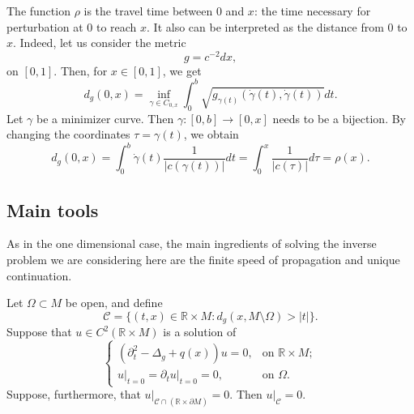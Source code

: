 \documentclass[12pt,oneside,final]{amsart}
\def\R{\mathbb R}
\begin{document}
The function $\rho$ is the travel time between $0$ and $x$: the time necessary for perturbation at $0$ to reach $x$. It also can be interpreted as the distance from $0$ to $x$.
Indeed, let us consider the metric
\begin{equation*}
	g = c^{-2} dx,
\end{equation*}
on $[0,1]$. Then, for $x\in [0,1]$, we get
\begin{equation*}
	d_g(0,x) = \inf_{\gamma\in C_{0,x}} \int_{0}^{b}  \sqrt{g_{\gamma(t)}(\dot{\gamma}(t), \dot{\gamma}(t))} dt.
\end{equation*}
Let $\gamma$ be a minimizer curve. Then $\gamma :[0,b] \rightarrow [0,x]$ needs to be a bijection. By changing the coordinates $\tau = \gamma(t)$, we obtain
\begin{equation*}
	d_g(0,x) = \int_{0}^{b} \dot{\gamma}(t) \frac{1}{|c(\gamma(t))|}dt = \int_{0}^{x} \frac{1}{|c(\tau)|} d\tau = \rho(x).
\end{equation*}





\subsection{Main tools}

As in the one dimensional case, the main ingredients of solving the inverse problem we are considering here are the finite speed of propagation and unique continuation. 

\begin{theorem}
	Let $\Omega\subset M$ be open, and define 
	\begin{equation*}
		\mathcal{C}= \{(t,x)\in \mathbb{R}\times M: d_g(x, M\setminus\Omega)>|t|\}.
	\end{equation*}
Suppose that $u \in C^2(\R \times M)$ is a solution of 
	\begin{equation*}
		\begin{cases}
			\left(\partial_t^2 - \Delta_g + q(x)\right) u = 0, & \text{on } \mathbb{R}\times M;\\
			\left.u\right|_{t=0} = \left.\partial_t u\right|_{t=0} = 0, & \text{on } \Omega.
		\end{cases}
	\end{equation*}
Suppose, furthermore, that $\left.u\right|_{\mathcal C \cap (\R \times \partial M)} = 0$.
	Then $\left.u\right|_{\mathcal{C}} = 0$.
\end{theorem}
\end{document}
